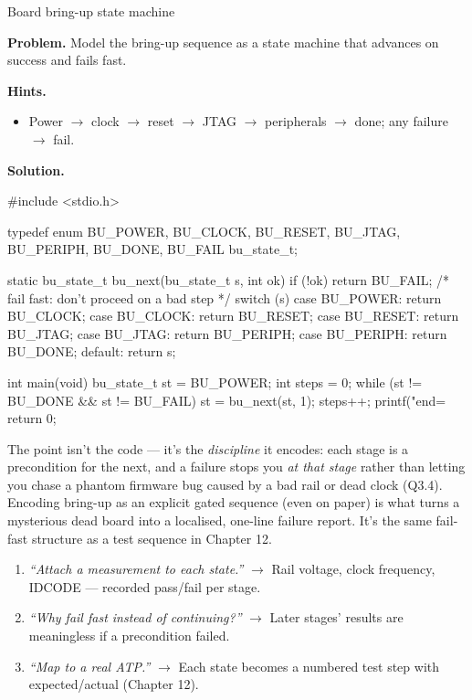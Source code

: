\begin{gymproblem}{Board bring-up state machine}

\textbf{Problem.} Model the bring-up sequence as a state machine that advances on
success and fails fast.

\textbf{Hints.}
\begin{itemize}
\item Power $\rightarrow$ clock $\rightarrow$ reset $\rightarrow$ JTAG
  $\rightarrow$ peripherals $\rightarrow$ done; any failure $\rightarrow$ fail.
\end{itemize}

\attempt

\textbf{Solution.}
\begin{cgym}
#include <stdio.h>

typedef enum { BU_POWER, BU_CLOCK, BU_RESET, BU_JTAG, BU_PERIPH, BU_DONE, BU_FAIL } bu_state_t;

static bu_state_t bu_next(bu_state_t s, int ok) {
    if (!ok) return BU_FAIL;                 /* fail fast: don't proceed on a bad step */
    switch (s) {
        case BU_POWER:  return BU_CLOCK;
        case BU_CLOCK:  return BU_RESET;
        case BU_RESET:  return BU_JTAG;
        case BU_JTAG:   return BU_PERIPH;
        case BU_PERIPH: return BU_DONE;
        default:        return s;
    }
}

int main(void) {
    bu_state_t st = BU_POWER; int steps = 0;
    while (st != BU_DONE && st != BU_FAIL) { st = bu_next(st, 1); steps++; }
    printf("end=%
    return 0;
}
\end{cgym}

The point isn't the code --- it's the \emph{discipline} it encodes: each stage is
a precondition for the next, and a failure stops you \emph{at that stage} rather
than letting you chase a phantom firmware bug caused by a bad rail or dead clock
(Q3.4). Encoding bring-up as an explicit gated sequence (even on paper) is what
turns a mysterious dead board into a localised, one-line failure report. It's the
same fail-fast structure as a test sequence in Chapter 12.

\followups
\begin{enumerate}
\item \emph{``Attach a measurement to each state.''} $\rightarrow$ Rail voltage,
  clock frequency, IDCODE --- recorded pass/fail per stage.
\item \emph{``Why fail fast instead of continuing?''} $\rightarrow$ Later stages'
  results are meaningless if a precondition failed.
\item \emph{``Map to a real ATP.''} $\rightarrow$ Each state becomes a numbered
  test step with expected/actual (Chapter 12).
\end{enumerate}
\end{gymproblem}

